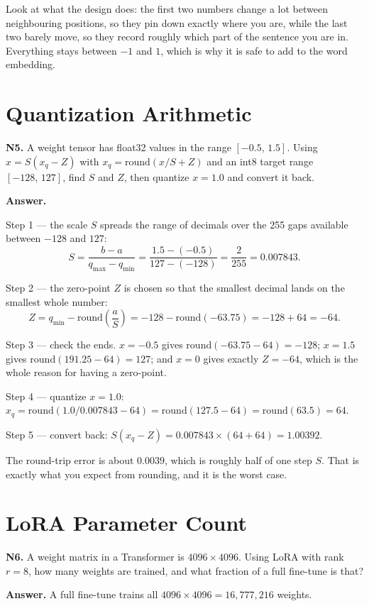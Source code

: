 \documentclass[11pt]{article}
\begin{document}
Look at what the design does: the first two numbers change a lot between neighbouring
positions, so they pin down exactly where you are, while the last two barely move, so they
record roughly which part of the sentence you are in. Everything stays between $-1$ and $1$,
which is why it is safe to add to the word embedding.

\section{Quantization Arithmetic}

\textbf{N5.} A weight tensor has float32 values in the range $[-0.5,\,1.5]$. Using
$x=S(x_q-Z)$ with $x_q=\mathrm{round}(x/S+Z)$ and an int8 target range $[-128,\,127]$, find
$S$ and $Z$, then quantize $x=1.0$ and convert it back.

\textbf{Answer.}

Step 1 --- the scale $S$ spreads the range of decimals over the 255 gaps available between
$-128$ and $127$:
\[
S=\frac{b-a}{q_{\max}-q_{\min}}=\frac{1.5-(-0.5)}{127-(-128)}=\frac{2}{255}=0.007843.
\]

Step 2 --- the zero-point $Z$ is chosen so that the smallest decimal lands on the smallest
whole number:
\[
Z=q_{\min}-\mathrm{round}\!\left(\frac{a}{S}\right)=-128-\mathrm{round}(-63.75)=-128+64=-64.
\]

Step 3 --- check the ends. $x=-0.5$ gives $\mathrm{round}(-63.75-64)=-128$; $x=1.5$ gives
$\mathrm{round}(191.25-64)=127$; and $x=0$ gives exactly $Z=-64$, which is the whole reason
for having a zero-point.

Step 4 --- quantize $x=1.0$:
$x_q=\mathrm{round}(1.0/0.007843-64)=\mathrm{round}(127.5-64)=\mathrm{round}(63.5)=64$.

Step 5 --- convert back: $S(x_q-Z)=0.007843\times(64+64)=1.00392$.

The round-trip error is about $0.0039$, which is roughly half of one step $S$. That is exactly
what you expect from rounding, and it is the worst case.

\section{LoRA Parameter Count}

\textbf{N6.} A weight matrix in a Transformer is $4096\times4096$. Using LoRA with rank $r=8$,
how many weights are trained, and what fraction of a full fine-tune is that?

\textbf{Answer.} A full fine-tune trains all $4096\times4096=16{,}777{,}216$ weights.
\end{document}
